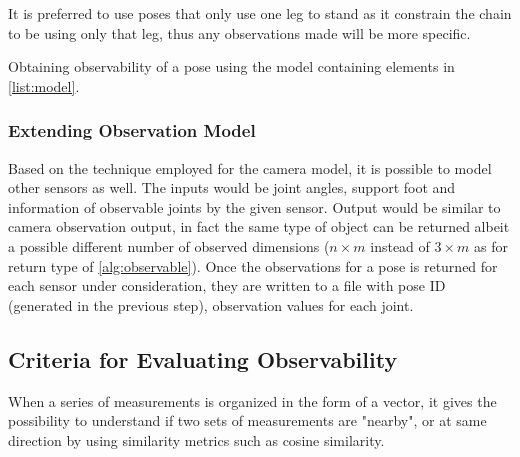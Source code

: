 \documentclass[english, printversion, nomenclature, notitle]{tuvisionthesis} %
\begin{document}
It is preferred to use poses that only use one leg to stand as it constrain the chain to be using only that leg, thus any observations made will be more specific.

\begin{algorithm}[]
	\caption[Obtaining observability of a pose]{Obtaining observability of a pose using the model containing elements in \cref{list:model}.}
	\label{alg:observable}
	\BlankLine
\end{algorithm}

\subsubsection{Extending Observation Model}

Based on the technique employed for the camera model, it is possible to model other sensors as well. The inputs would be joint angles, support foot and information of observable joints by the given sensor.
Output would be similar to camera observation output, in fact the same type of object can be returned albeit a possible different number of observed dimensions ($n \times m$ instead of $3 \times m$ as for return type of \cref{alg:observable}). Once the observations for a pose is returned for each sensor under consideration, they are written to a file with pose ID (generated in the previous step), observation values for each joint. 

\subsection{Criteria for Evaluating Observability}
\label{subsec:obs_eval}
When a series of measurements is organized in the form of a vector, it gives the possibility to understand if two sets of measurements are "nearby", or at same direction by using similarity metrics such as cosine similarity. 
\end{document}
